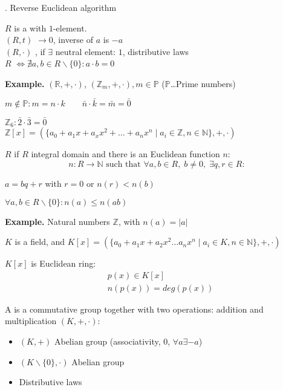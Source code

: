 \Proof.
Reverse Euclidean algorithm

\begin{definition}
$R$ is a  with $1$-element.\\
$(R,t)$  $\rightarrow 0$, inverse of $a$ is $-a$\\
$(R,\cdot)$ , if $\exists$ neutral element: $1$, distributive laws\\
$R$  $\iff \nexists a,b \in R \backslash \{0\}: a \cdot b = 0$
\end{definition}

\textbf{Example.}
$(\mathbb{R}, +, \cdot)$, $(\mathbb{Z}_m, + , \cdot), m \in \mathbb{P}$ ($\mathbb{P}$…Prime numbers)

$m\not\in \mathbb{P}: m = n \cdot k \qquad \bar{n} \cdot \bar{k} = \bar{m} = \bar{0}$

$\mathbb{Z}_6 : \bar{2} \cdot \bar{3} = \bar{0}$ \\
$\mathbb{Z}[x] = (\{a_0 + a_1 x + a_x x^2 + \ldots + a_n x^n \mid a_i \in \mathbb{Z}, n \in \mathbb{N} \},+,\cdot)$

\begin{definition}
$R$  if $R$ integral domain and there is an Euclidean function $n$:
\[
  n : R \rightarrow \mathbb{N} \text{ such that } \forall a,b \in R,\; b \neq 0,\; \exists q,r \in R:
\]

\begin{compactenum}
\item $a = bq + r$ with $r = 0$ or $n(r) < n(b)$
\item $\forall a,b \in R \backslash \{0\} : n(a) \leq n(ab)$
\end{compactenum}
\end{definition}

\textbf{Example.}
Natural numbers $\mathbb{Z}$, with $n(a) = |a|$

$K$ is a field, and $K[x] =
\left(\{a_0 + a_1 x + a_2 x^2 \ldots a_n x^n \mid a_i \in K, n \in \mathbb{N} \}
,+, \cdot \right)$

$K[x]$ is Euclidean ring:
\begin{align*}
  &p(x) \in K[x] \\
  &n(p(x)) = deg(p(x))
\end{align*}

\begin{definition}
A  is a commutative group together with two operations: addition and multiplication
$(K, +, \cdot):$
\begin{itemize}
  \item $(K,+)$ Abelian group (associativity, 0, $\forall a \exists -a$)
  \item $(K \backslash \{0\}, \cdot)$ Abelian group
  \item Distributive laws
\end{itemize}
\end{definition}

